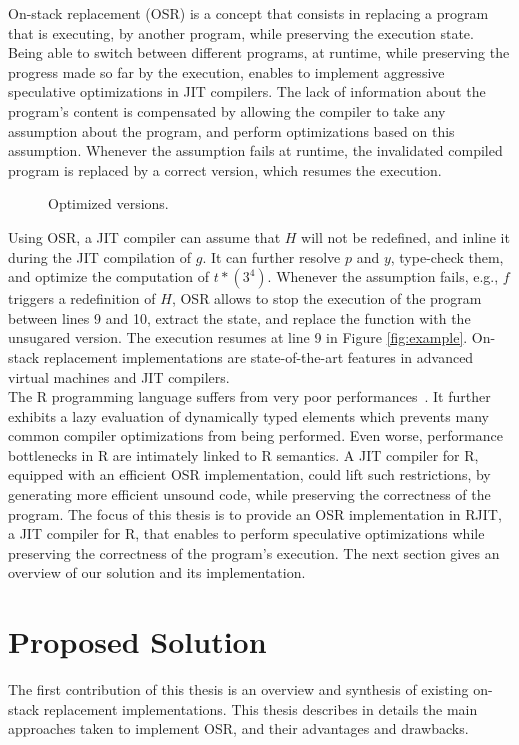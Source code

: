 On-stack replacement (OSR) is a concept that consists in replacing a program that is executing, by another program, while preserving the execution state.
Being able to switch between different programs, at runtime, while preserving the progress made so far by the execution, enables to implement aggressive speculative optimizations in JIT compilers.
The lack of information about the program's content is compensated by allowing the compiler to take any assumption about the program, and perform optimizations based on this assumption.
Whenever the assumption fails at runtime, the invalidated compiled program is replaced by a correct version, which resumes the execution.\\

\begin{wrapfigure}[13]{l}{6.5cm}
\caption{Optimized versions.}
\end{wrapfigure}
Using OSR, a JIT compiler can assume that $H$ will not be redefined, and inline it during the JIT compilation of $g$.
It can further resolve $p$ and $y$, type-check them, and optimize the computation of $t * (3 ^ 4)$.
Whenever the assumption fails, e.g., $f$ triggers a redefinition of $H$, OSR allows to stop the execution of the program between lines 9 and 10, extract the state, and replace the function with the unsugared version.
The execution resumes at line 9 in Figure \ref{fig:example}.
On-stack replacement implementations are state-of-the-art features in advanced virtual machines and JIT compilers.\\


The R programming language suffers from very poor performances~\cite{morandat2012evaluating}. 
It further exhibits a lazy evaluation of dynamically typed elements which prevents many common compiler optimizations from being performed.
Even worse, performance bottlenecks in R are intimately linked to R semantics. 
A JIT compiler for R, equipped with an efficient OSR implementation, could lift such restrictions, by generating more efficient unsound code, while preserving the correctness of the program.
The focus of this thesis is to provide an OSR implementation in RJIT, a JIT compiler for R, that enables to perform speculative optimizations while preserving the correctness of the program's execution.
The next section gives an overview of our solution and its implementation.\\

\section{Proposed Solution}
The first contribution of this thesis is an overview and synthesis of existing on-stack replacement implementations.
This thesis describes in details the main approaches taken to implement OSR, and their advantages and drawbacks.\\

